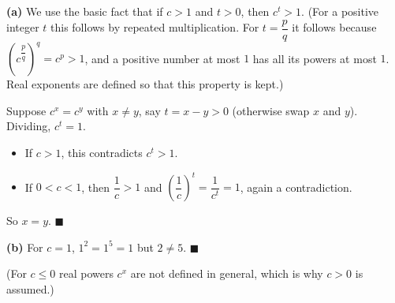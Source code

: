 \textbf{(a)} We use the basic fact that if $c>1$ and $t>0$, then $c^t>1$. (For a positive integer $t$ this follows by repeated multiplication. For $t=\dfrac pq$ it follows because $\left(c^{\dfrac pq}\right)^q=c^p>1$, and a positive number at most $1$ has all its powers at most $1$. Real exponents are defined so that this property is kept.)

Suppose $c^x=c^y$ with $x\ne y$, say $t=x-y>0$ (otherwise swap $x$ and $y$). Dividing, $c^t=1$.
\begin{itemize}
\item If $c>1$, this contradicts $c^t>1$.
\item If $0<c<1$, then $\dfrac1c>1$ and $\left(\dfrac1c\right)^t=\dfrac{1}{c^t}=1$, again a contradiction.
\end{itemize}
So $x=y$. $\blacksquare$

\textbf{(b)} For $c=1$, $1^2=1^5=1$ but $2\ne5$. $\blacksquare$

(For $c\le0$ real powers $c^x$ are not defined in general, which is why $c>0$ is assumed.)
